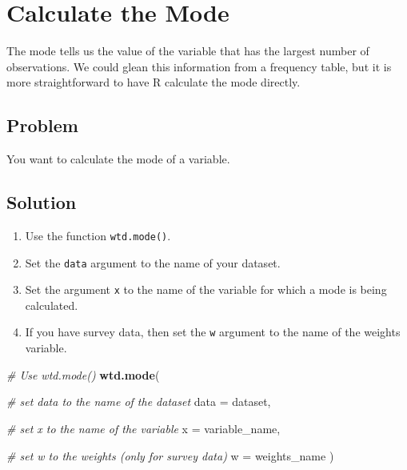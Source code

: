 \documentclass[
]{book}
\newenvironment{Shaded}{\begin{snugshade}}{\end{snugshade}}
\newcommand{\AttributeTok}[1]{\textcolor[rgb]{0.13,0.29,0.53}{#1}}
\newcommand{\CommentTok}[1]{\textcolor[rgb]{0.56,0.35,0.01}{\textit{#1}}}
\newcommand{\FunctionTok}[1]{\textcolor[rgb]{0.13,0.29,0.53}{\textbf{#1}}}
\newcommand{\NormalTok}[1]{#1}
\providecommand{\tightlist}{%
  \setlength{\itemsep}{0pt}\setlength{\parskip}{0pt}}
\begin{document}
\hypertarget{mode}{%
\section{Calculate the Mode}\label{mode}}

The mode tells us the value of the variable that has the largest number of observations. We could glean this information from a frequency table, but it is more straightforward to have R calculate the mode directly.

\hypertarget{problem-31}{%
\subsection{Problem}\label{problem-31}}

You want to calculate the mode of a variable.

\hypertarget{solution-30}{%
\subsection{Solution}\label{solution-30}}

\begin{enumerate}
\def\labelenumi{\arabic{enumi}.}
\tightlist
\item
  Use the function \texttt{wtd.mode()}.
\item
  Set the \texttt{data} argument to the name of your dataset.
\item
  Set the argument \texttt{x} to the name of the variable for which a mode is being calculated.
\item
  If you have survey data, then set the \texttt{w} argument to the name of the weights variable.
\end{enumerate}

\begin{Shaded}
\begin{Highlighting}[]
\CommentTok{\# Use \textasciigrave{}wtd.mode()\textasciigrave{}}
\FunctionTok{wtd.mode}\NormalTok{(}
  
  \CommentTok{\# set data to the name of the dataset}
  \AttributeTok{data =}\NormalTok{ dataset,}
  
  \CommentTok{\# set x to the name of the variable}
  \AttributeTok{x =}\NormalTok{ variable\_name,}
  
  \CommentTok{\# set w to the weights (only for survey data)}
  \AttributeTok{w =}\NormalTok{ weights\_name}
\NormalTok{)}
\end{Highlighting}
\end{Shaded}
\end{document}
